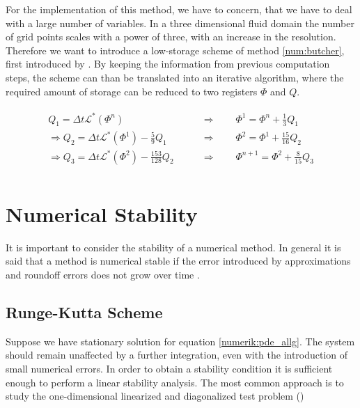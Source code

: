 For the implementation of this method, we have to concern, that we have to deal with a large number of variables.
In a three dimensional fluid domain the number of grid points scales with a power of three, with an increase in the resolution.
Therefore we want to introduce a low-storage scheme of method \ref{num:butcher},  first introduced by \citep{Williamson1980}.
By keeping the information from previous computation steps, the scheme can than be translated into an iterative algorithm,
where the required amount of storage can be reduced to two registers $\Phi$ and $Q$.

\begin{align}
    \begin{split}
    Q_1 = \Delta t \mathcal{L}^*\left(\Phi^n\right)\qquad &\Rightarrow \qquad \Phi^{1} = \Phi^n + \frac{1}{3}Q_1 \\
    \Rightarrow Q_2 = \Delta t \mathcal{L}^*\left(\Phi^1\right) - \frac{5}{9} Q_1 \qquad &\Rightarrow \qquad \Phi^{2} = \Phi^1 + \frac{15}{16}Q_2 \\
   \Rightarrow  Q_3 = \Delta t \mathcal{L}^*\left(\Phi^2\right) - \frac{153}{128} Q_2 \qquad &\Rightarrow \qquad \Phi^{n+1} = \Phi^2 + \frac{8}{15}Q_3 \\
    \end{split}
\end{align}


\section{Numerical Stability}

It is important to consider the stability of a numerical method. In general it is said that a method is numerical stable if the error
introduced by approximations and roundoff errors does not grow over time \citep{ferziger99}.\\

\subsection{Runge-Kutta Scheme}

Suppose we have stationary solution for equation \ref{numerik:pde_allg}.
The system should remain unaffected by a further integration, even with the introduction of small numerical errors.
In order to obtain a stability condition it is sufficient enough to perform a linear stability analysis.
The most common approach is to study the one-dimensional linearized and diagonalized test problem (\citep{BLABLA})

